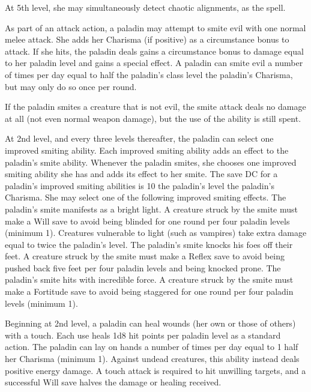 At 5th level, she may simultaneously detect chaotic alignments, as the  spell.

 As part of an attack action, a paladin may attempt to smite evil with one normal melee attack. She adds her Charisma (if positive) as a circumstance bonus to attack. If she hits, the paladin deals gains a circumstance bonus to damage equal to her paladin level and gains a special effect.  A paladin can smite evil a number of times per day equal to half the paladin's class level \add the paladin's Charisma, but may only do so once per round.

If the paladin smites a creature that is not evil, the smite attack deals no damage at all (not even normal weapon damage), but the use of the ability is still spent.

 At 2nd level, and every three levels thereafter, the paladin can select one improved smiting ability. Each improved smiting ability adds an effect to the paladin's smite ability. Whenever the paladin smites, she chooses one improved smiting ability she has and adds its effect to her smite. The save DC for a paladin's improved smiting abilities is 10 \add the paladin's level \add the paladin's Charisma. She may select one of the following improved smiting effects.
 The paladin's smite manifests as a bright light. A creature struck by the smite must make a Will save to avoid being blinded for one round per four paladin levels (minimum 1). Creatures vulnerable to light (such as vampires) take extra damage equal to twice the paladin's level.
 The paladin's smite knocks his foes off their feet. A creature struck by the smite must make a Reflex save to avoid being pushed back five feet per four paladin levels and being knocked prone.
 The paladin's smite hits with incredible force. A creature struck by the smite must make a Fortitude save to avoid being staggered for one round per four paladin levels (minimum 1).

 Beginning at 2nd level, a paladin can heal wounds (her own or those of others) with a touch. Each use heals 1d8 hit points per paladin level as a standard action. The paladin can lay on hands a number of times per day equal to 1 \add half her Charisma (minimum 1). Against undead creatures, this ability instead deals positive energy damage. A touch attack is required to hit unwilling targets, and a successful Will save halves the damage or healing received.

